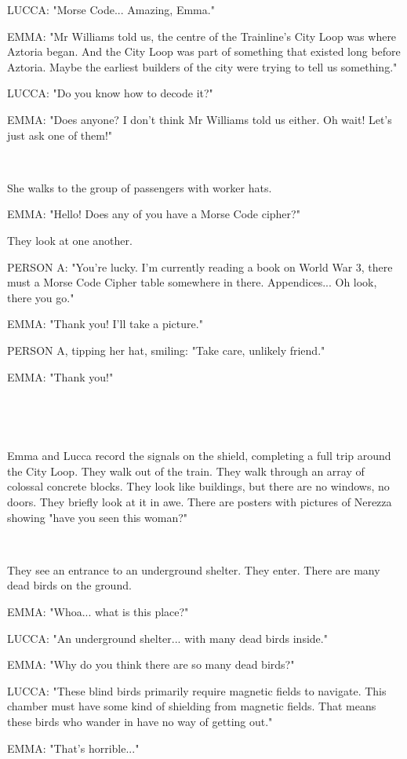 \documentclass[11pt]{article}
\begin{document}
LUCCA: "Morse Code... Amazing, Emma."

EMMA: "Mr Williams told us, the centre of the Trainline's City Loop was where Aztoria began.
And the City Loop was part of something that existed long before Aztoria.
Maybe the earliest builders of the city were trying to tell us something."

LUCCA: "Do you know how to decode it?"

EMMA: "Does anyone? I don't think Mr Williams told us either.
Oh wait! Let's just ask one of them!"

\ 

She walks to the group of passengers with worker hats.

EMMA: "Hello!
Does any of you have a Morse Code cipher?"

They look at one another.

PERSON A: "You're lucky. I'm currently reading a book on World War 3, there must a Morse Code Cipher table somewhere in there.
Appendices...
Oh look, there you go."

EMMA: "Thank you! I'll take a picture."

PERSON A, tipping her hat, smiling: "Take care, unlikely friend."

EMMA: "Thank you!"

\ 

\ 

Emma and Lucca record the signals on the shield, completing a full trip around the City Loop.
They walk out of the train.
They walk through an array of colossal concrete blocks.
They look like buildings, but there are no windows, no doors.
They briefly look at it in awe.
There are posters with pictures of Nerezza showing "have you seen this woman?"

\ 

They see an entrance to an underground shelter.
They enter.
There are many dead birds on the ground.

EMMA: "Whoa... what is this place?"

LUCCA: "An underground shelter... with many dead birds inside."

EMMA: "Why do you think there are so many dead birds?"

LUCCA: "These blind birds primarily require magnetic fields to navigate. This chamber must have some kind of shielding from magnetic fields.
That means these birds who wander in have no way of getting out."

EMMA: "That's horrible..."
\end{document}
